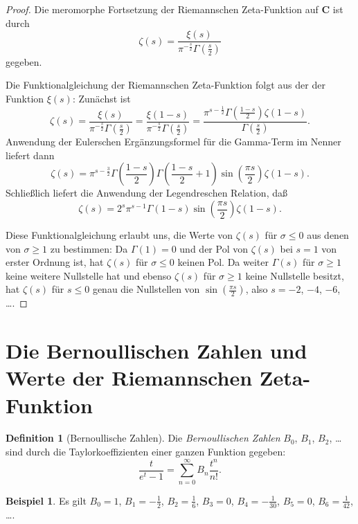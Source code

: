 \documentclass[a4paper,twoside,openright]{report}
\theoremstyle{definition}
\newtheorem{dfn}[thm]{Definition}
\newtheorem{xca}[thm]{Beispiel}
\theoremstyle{remark}
\begin{document}
\begin{proof}
  Die meromorphe Fortsetzung der Riemannschen Zeta-Funktion auf $\mathbf C$ ist
  durch
  \[
    \zeta(s) = \frac{\xi(s)} {\pi^{- \frac s 2} \Gamma(\frac s 2)}
  \]
  gegeben.
  
  Die Funktionalgleichung der Riemannschen Zeta-Funktion folgt aus der der
  Funktion $\xi(s)$: Zunächst ist
  \[
    \zeta(s) = \frac{\xi(s)}{\pi^{-\frac s 2} \Gamma\left(\frac s 2\right)}
    = \frac{\xi(1 - s)}{\pi^{- \frac s 2} \Gamma\left(\frac s 2\right)}
    = \frac{\pi^{s - \frac 1 2} \Gamma\left(\frac{1 - s} 2\right) \zeta(1 - s)}{\Gamma\left(\frac s 2\right)}.
  \]
  Anwendung der Eulerschen Ergänzungsformel für die Gamma-Term im Nenner liefert
  dann
  \[
    \zeta(s) = \pi^{s - \frac 3 2} \Gamma\left(\frac {1 - s} 2 \right) \Gamma\left(\frac{1 - s} 2 + 1\right)
    \sin\left(\frac{\pi s}2\right) \zeta(1 - s).
  \]
  Schließlich liefert die Anwendung der Legendreschen Relation, daß
  \[
    \zeta(s) = 2^s \pi^{s - 1} \Gamma(1 - s) \sin\left(\frac{\pi s} 2\right) \zeta(1 - s).
  \] 
 
  Diese Funktionalgleichung erlaubt uns, die Werte von $\zeta(s)$ für $\sigma \leq 0$
  aus denen von $\sigma \ge 1$ zu bestimmen: Da $\Gamma(1) = 0$ und der Pol von
  $\zeta(s)$ bei $s = 1$ von erster Ordnung ist, hat $\zeta(s)$ für $\sigma \leq 0$
  keinen Pol. Da weiter $\Gamma(s)$ für $\sigma \ge 1$ keine weitere Nullstelle 
  hat und ebenso $\zeta(s)$ für $\sigma \ge 1$ keine Nullstelle besitzt, hat
  $\zeta(s)$ für $s \leq 0$ genau die Nullstellen von $\sin\left(\frac{\pi s} 2\right)$,
  also $s = -2$, $-4$, $-6$, \dots.
\end{proof}

\section{Die Bernoullischen Zahlen und Werte der Riemannschen Zeta-Funktion}

\begin{dfn}[Bernoullische Zahlen]
  Die \emph{Bernoullischen Zahlen} $B_0$, $B_1$, $B_2$, \dots
  sind durch die Taylorkoeffizienten einer ganzen Funktion gegeben:
  \[
    \frac{t}{e^t - 1} = \sum_{n = 0}^\infty B_n \frac{t^n}{n!}.
  \]
\end{dfn}

\begin{xca}
  Es gilt $B_0 = 1$, $B_1 = - \frac 1 2$, $B_2 = \frac 1 6$, $B_3 = 0$,
  $B_4 = - \frac 1 {30}$, $B_5 = 0$, $B_6 = \frac 1 {42}$, \dots.
\end{xca}
\end{document}
